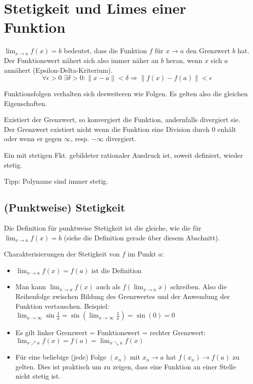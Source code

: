 \section{Stetigkeit und Limes einer Funktion}
$\lim_{x \to a} f(x) = b$ bedeutet, dass die Funktion $f$ für $x \to a$ den
Grenzwert $b$ hat. Der Funktionswert nähert sich also immer näher an $b$ heran,
wenn $x$ sich $a$ annähert (Epsilon-Delta-Kriterium).
\[
\forall \epsilon > 0 \; \exists \delta > 0: \|x -a\| < \delta \Rightarrow
\|f(x) - f(a)\| < \epsilon
\]

Funktionsfolgen verhalten sich desweiteren wie Folgen. Es gelten also die
gleichen Eigenschaften.

Existiert der Grenzwert, so konvergiert die Funktion, andernfalls divergiert sie. 
Der Grenzwert existiert nicht wenn die Funktion eine Division durch 0 enhält oder 
wenn er gegen $\infty$, resp. $-\infty$ divergiert.

Ein mit stetigen Fkt. gebildeter rationaler Ausdruck ist, soweit definiert, wieder stetig.

Tipp: Polyname sind immer stetig.

\subsection{(Punktweise) Stetigkeit}
Die Definition für punktweise Stetigkeit ist die gleiche, wie die für
$\lim_{x \to a} f(x) = b$ (siehe die Definition gerade über diesem Abschnitt).

Charakterisierungen der Stetigkeit von $f$ im Punkt $a$:
\begin{itemize}
	\item $\lim_{x \to a} f(x) = f(a)$ ist die Definition
	\item Man kann $\lim_{x \to a} f(x)$ auch als $f(\lim_{x \to a} x)$ schreiben.
	Also die Reihenfolge zwischen Bildung des Grenzwertes und der Anwendung der
	Funktion vertauschen. Beispiel: $\lim_{x \to \infty} \sin\frac{1}{x} =
	\sin(\lim_{x \to \infty} \frac{1}{x}) = \sin(0) = 0$
	\item Es gilt linker Grenzwert = Funktionswert = rechter Grenzwert: $\lim_{x
	\nearrow a} f(x) = f(a) = \lim_{x \searrow a} f(x)$
	\item Für eine beliebige (jede) Folge $(x_n)$ mit $x_n \to a$ hat $f(x_n) \to
	f(a)$ zu gelten. Dies ist praktisch um zu zeigen, dass eine Funktion an einer
	Stelle nicht stetig ist.
\end{itemize}

